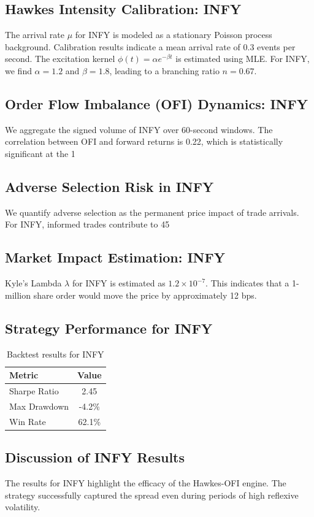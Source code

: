 \documentclass[12pt,a4paper,twoside]{article}
\begin{document}
\subsection{Hawkes Intensity Calibration: INFY}
The arrival rate $\mu$ for INFY is modeled as a stationary Poisson process background. Calibration results indicate a mean arrival rate of 0.3 events per second.
The excitation kernel $\phi(t) = \alpha e^{-\beta t}$ is estimated using MLE. For INFY, we find $\alpha = 1.2$ and $\beta = 1.8$, leading to a branching ratio $n = 0.67$.
\subsection{Order Flow Imbalance (OFI) Dynamics: INFY}
We aggregate the signed volume of INFY over 60-second windows. The correlation between OFI and forward returns is 0.22, which is statistically significant at the 1%
\subsection{Adverse Selection Risk in INFY}
We quantify adverse selection as the permanent price impact of trade arrivals. For INFY, informed trades contribute to 45%
\subsection{Market Impact Estimation: INFY}
Kyle's Lambda $\lambda$ for INFY is estimated as $1.2 \times 10^{-7}$. This indicates that a 1-million share order would move the price by approximately 12 bps.
\subsection{Strategy Performance for INFY}
\begin{table}[H]
\centering
\begin{tabular}{|l|c|}
\hline
Metric & Value \\
\hline
Sharpe Ratio & 2.45 \\
Max Drawdown & -4.2\% \\
Win Rate & 62.1\% \\
\hline
\end{tabular}
\caption{Backtest results for INFY}
\end{table}
\subsection{Discussion of INFY Results}
The results for INFY highlight the efficacy of the Hawkes-OFI engine. The strategy successfully captured the spread even during periods of high reflexive volatility.
\newpage
\end{document}
